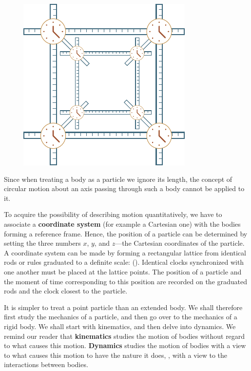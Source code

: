 \begin{figure}[t]
	\begin{center}
		\includegraphics[scale=0.95]{figures/ch_01/fig_1_3.pdf}
		\caption[]{}
		\label{fig:1_3}
	\end{center}
	\vspace{-0.8cm}
\end{figure}

Since when treating a body as a particle we ignore its length, the concept of circular motion about an axis passing through such a body cannot be applied to it.

To acquire the possibility of describing motion quantitatively, we have to associate a \textbf{coordinate system} (for example a Cartesian one) with the bodies forming a reference frame. Hence, the position of a particle can be determined by setting the three numbers $x$, $y$, and $z$---the Cartesian coordinates of the particle. A coordinate system can be made by forming a rectangular lattice from identical rods or rules graduated to a definite scale: (). Identical clocks synchronized with one another must be placed at the lattice points. The position of a particle and the moment of time corresponding to this position are recorded on the graduated rods and the clock closest to the particle.

It is simpler to treat a point particle than an extended body. We shall therefore first study the mechanics of a particle, and then go over to the mechanics of a rigid body. We shall start with kinematics, and then delve into dynamics. We remind our reader that \textbf{kinematics} studies the motion of bodies without regard to what causes this motion. \textbf{Dynamics} studies the motion of bodies with a view to what causes this motion to have the nature it does, \ie, with a view to the interactions between bodies.

